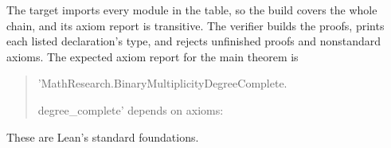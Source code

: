 The target imports every module in the table, so the build covers the whole
chain, and its axiom report is transitive. The verifier builds the proofs, prints each listed
declaration's type, and rejects unfinished proofs and nonstandard axioms. The
expected axiom report for the main theorem is
\begin{quote}\small\ttfamily
'MathResearch.BinaryMultiplicityDegreeComplete.\par
degree\_complete' depends on axioms:\par
[propext, Classical.choice, Quot.sound]
\end{quote}
These are Lean's standard foundations.
